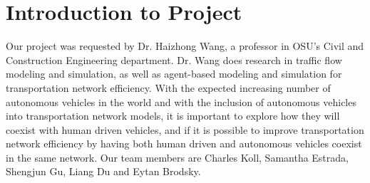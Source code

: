 \documentclass[onecolumn, draftclsnofoot,10pt, compsoc]{IEEEtran}
\begin{document}
\section{Introduction to Project}
Our project was requested by Dr. Haizhong Wang, a professor in OSU’s Civil and Construction Engineering department.
Dr. Wang does research in traffic flow modeling and simulation, as well as agent-based modeling and simulation for transportation network efficiency.
With the expected increasing number of autonomous vehicles in the world and with the inclusion of autonomous vehicles into transportation network models, it is important to explore how they will coexist with human driven vehicles, and if it is possible to improve transportation network efficiency by having both human driven and autonomous vehicles coexist in the same network.
Our team members are Charles Koll, Samantha Estrada, Shengjun Gu, Liang Du and Eytan Brodsky.
\newpage
\end{document}
